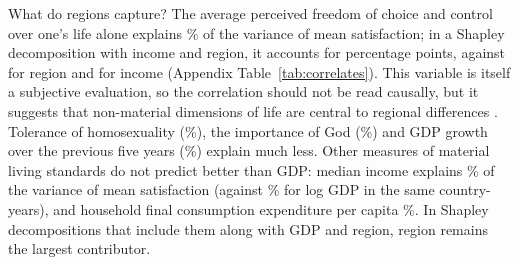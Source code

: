 \documentclass[12pt]{article}
\begin{document}
What do regions capture? The average perceived freedom of choice and control over one's life alone explains \RtwoFreedomSatisfaction\% of the variance of mean satisfaction; in a Shapley decomposition with income and region, it accounts for \shapleyFreedom percentage points, against \shapleyFreedomRegion for region and \shapleyFreedomIncome for income (Appendix Table~\ref{tab:correlates}). This variable is itself a subjective evaluation, so the correlation should not be read causally, but it suggests that non-material dimensions of life are central to regional differences \citep{inglehart_development_2008}. Tolerance of homosexuality (\RtwoTolerance\%), the importance of God (\RtwoGod\%) and GDP growth over the previous five years (\RtwoGrowth\%) explain much less. Other measures of material living standards do not predict better than GDP: median income %
\citep{worldbank_pip_2026} explains \RtwoMedianIncome\% of the variance of mean satisfaction (against \RtwoGDPMedianSample\% for log GDP in the same country-years), and household final consumption expenditure per capita \RtwoHFCE\%. In Shapley decompositions that include them along with GDP and region, region remains the largest contributor. %
\end{document}

